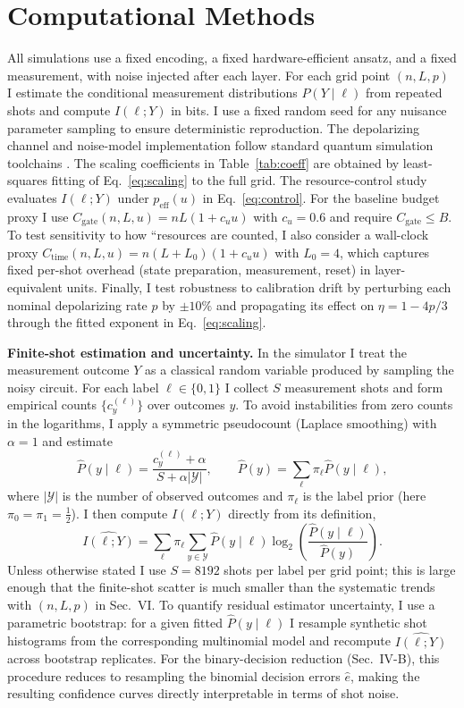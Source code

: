 \documentclass[journal]{IEEEtran}
\newcommand{\MI}{I(\ell;Y)}
\newcommand{\peff}{p_{\mathrm{eff}}(u)}
\begin{document}
\section{Computational Methods}
All simulations use a fixed encoding, a fixed hardware-efficient ansatz, and a fixed measurement, with noise injected after each layer. For each grid point $(n,L,p)$ I estimate the conditional measurement distributions $P(Y\mid \ell)$ from repeated shots and compute $\MI$ in bits. I use a fixed random seed for any nuisance parameter sampling to ensure deterministic reproduction. The depolarizing channel and noise-model implementation follow standard quantum simulation toolchains \cite{ref8,ref9}. The scaling coefficients in Table~\ref{tab:coeff} are obtained by least-squares fitting of Eq.~\eqref{eq:scaling} to the full grid. The resource-control study evaluates $\MI$ under $\peff$ in Eq.~\eqref{eq:control}. For the baseline budget proxy I use $C_{\mathrm{gate}}(n,L,u)=nL(1+c_u u)$ with $c_u=0.6$ and require $C_{\mathrm{gate}}\le B$. To test sensitivity to how ``resources are counted, I also consider a wall-clock proxy $C_{\mathrm{time}}(n,L,u)=n(L+L_0)(1+c_u u)$ with $L_0=4$, which captures fixed per-shot overhead (state preparation, measurement, reset) in layer-equivalent units. Finally, I test robustness to calibration drift by perturbing each nominal depolarizing rate $p$ by $\pm10\%$ and propagating its effect on $\eta=1-4p/3$ through the fitted exponent in Eq.~\eqref{eq:scaling}.

\par\medskip
\noindent\textbf{Finite-shot estimation and uncertainty.}
In the simulator I treat the measurement outcome $Y$ as a classical random variable produced by sampling the noisy circuit. For each label $\ell\in\{0,1\}$ I collect $S$ measurement shots and form empirical counts $\{c_y^{(\ell)}\}$ over outcomes $y$.
To avoid instabilities from zero counts in the logarithms, I apply a symmetric pseudocount (Laplace smoothing) with $\alpha=1$ and estimate
\[
\widehat{P}(y\mid \ell)=\frac{c_y^{(\ell)}+\alpha}{S+\alpha|\mathcal{Y}|},\qquad 
\widehat{P}(y)=\sum_{\ell}\pi_{\ell}\widehat{P}(y\mid \ell),
\]
where $|\mathcal{Y}|$ is the number of observed outcomes and $\pi_{\ell}$ is the label prior (here $\pi_0=\pi_1=\tfrac{1}{2}$).
I then compute $\MI$ directly from its definition,
\[
\widehat{\MI}=\sum_{\ell}\pi_{\ell}\sum_{y\in\mathcal{Y}}
\widehat{P}(y\mid \ell)\log_2\!\left(\frac{\widehat{P}(y\mid \ell)}{\widehat{P}(y)}\right).
\]
Unless otherwise stated I use $S=8192$ shots per label per grid point; this is large enough that the finite-shot scatter is much smaller than the systematic trends with $(n,L,p)$ in Sec.~VI.
To quantify residual estimator uncertainty, I use a parametric bootstrap: for a given fitted $\widehat{P}(y\mid\ell)$ I resample synthetic shot histograms from the corresponding multinomial model and recompute $\widehat{\MI}$ across bootstrap replicates.
For the binary-decision reduction (Sec.~IV-B), this procedure reduces to resampling the binomial decision errors $\widehat{e}$, making the resulting confidence curves directly interpretable in terms of shot noise.
\par\medskip
\end{document}
